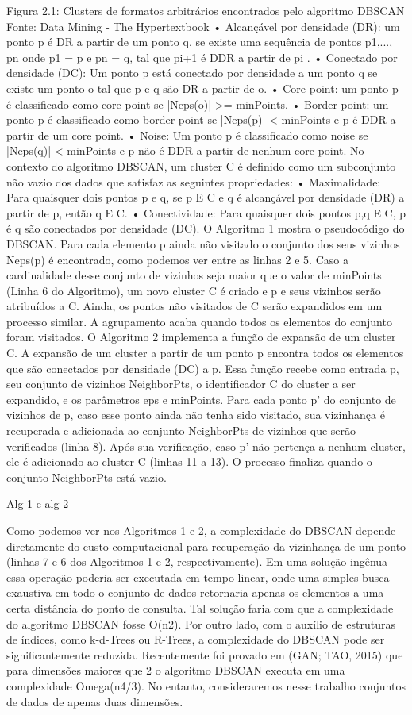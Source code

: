 Figura 2.1: Clusters de formatos arbitrários encontrados pelo algoritmo DBSCAN
Fonte: Data Mining - The Hypertextbook
• Alcançável por densidade (DR): um ponto p é DR a partir de um ponto q, se existe uma
sequência de pontos {p1,..., pn} onde p1 = p e pn = q, tal que pi+1 é DDR a partir de pi
.
• Conectado por densidade (DC): Um ponto p está conectado por densidade a um ponto q
se existe um ponto o tal que p e q são DR a partir de o.
• Core point: um ponto p é classificado como core point se |Neps(o)| >= minPoints.
• Border point: um ponto p é classificado como border point se |Neps(p)| < minPoints e p
é DDR a partir de um core point.
• Noise: Um ponto p é classificado como noise se |Neps(q)| < minPoints e p não é DDR a
partir de nenhum core point.
No contexto do algoritmo DBSCAN, um cluster C é definido como um subconjunto
não vazio dos dados que satisfaz as seguintes propriedades:
• Maximalidade: Para quaisquer dois pontos p e q, se p E C e q é alcançável por densidade
(DR) a partir de p, então q E C.
• Conectividade: Para quaisquer dois pontos p,q E C, p é q são conectados por densidade
(DC).
O Algoritmo 1 mostra o pseudocódigo do DBSCAN. Para cada elemento p ainda
não visitado o conjunto dos seus vizinhos Neps(p) é encontrado, como podemos ver entre as linhas
2 e 5. Caso a cardinalidade desse conjunto de vizinhos seja maior que o valor de minPoints
(Linha 6 do Algoritmo), um novo cluster C é criado e p e seus vizinhos serão atribuídos a C.
Ainda, os pontos não visitados de C serão expandidos em um processo similar. A agrupamento
acaba quando todos os elementos do conjunto foram visitados.
O Algoritmo 2 implementa a função de expansão de um cluster C. A expansão
de um cluster a partir de um ponto p encontra todos os elementos que são conectados por
densidade (DC) a p. Essa função recebe como entrada p, seu conjunto de vizinhos NeighborPts,
o identificador C do cluster a ser expandido, e os parâmetros eps e minPoints. Para cada ponto
p' do conjunto de vizinhos de p, caso esse ponto ainda não tenha sido visitado, sua vizinhança
é recuperada e adicionada ao conjunto NeighborPts de vizinhos que serão verificados (linha
8). Após sua verificação, caso p' não pertença a nenhum cluster, ele é adicionado ao cluster C
(linhas 11 a 13). O processo finaliza quando o conjunto NeighborPts está vazio.

Alg 1 e alg 2

Como podemos ver nos Algoritmos 1 e 2, a complexidade do DBSCAN depende
diretamente do custo computacional para recuperação da vizinhança de um ponto (linhas 7 e
6 dos Algoritmos 1 e 2, respectivamente). Em uma solução ingênua essa operação poderia ser
executada em tempo linear, onde uma simples busca exaustiva em todo o conjunto de dados
retornaria apenas os elementos a uma certa distância do ponto de consulta. Tal solução faria
com que a complexidade do algoritmo DBSCAN fosse O(n2). Por outro lado, com o auxílio
de estruturas de índices, como k-d-Trees ou R-Trees, a complexidade do DBSCAN pode ser
significantemente reduzida. Recentemente foi provado em (GAN; TAO, 2015) que para dimensões
maiores que 2 o algoritmo DBSCAN executa em uma complexidade Omega(n4/3). No entanto,
consideraremos nesse trabalho conjuntos de dados de apenas duas dimensões.

